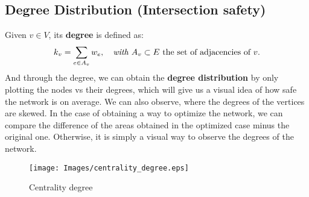 \documentclass[letterpaper, 10 pt, conference]{ieeeconf}  %
\begin{document}
\subsection{Degree Distribution (Intersection safety)}
\label{degree_distribution}

Given $v \in V$, its \textbf{degree} is defined as:
\begin{equation}
    k_{v} = \sum_{e \in A_{v}} w_{e}, \quad \textit{with } A_{v} \subset E \textup{ the set of adjacencies of } v.
\end{equation}
And through the degree, we can obtain the \textbf{degree distribution} by only plotting the nodes vs their degrees, which will give us a visual idea of how safe the network is on average. We can also observe, where the degrees of the vertices are skewed. In the case of obtaining a way to optimize the network, we can compare the difference of the areas obtained in the optimized case minus the original one. Otherwise, it is simply a visual way to observe the degrees of the network.
\begin{figure}
    \centering
    \texttt{[image: Images/centrality\_degree.eps]}
    \caption{Centrality degree}
    \label{Cd_academic_example}
\end{figure}


\end{document}
